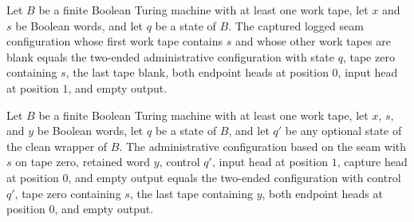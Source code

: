 \begin{lemma}
\label{Complexity.enumCont_clean_entry_words}
\leanok
{}
Let $B$ be a finite Boolean Turing machine with at least one work tape, let $x$ and $s$
be Boolean words, and let $q$ be a state of $B$. The captured logged seam configuration
whose first work tape contains $s$ and whose other work tapes are blank equals the
two-ended administrative configuration with state $q$, tape zero containing $s$, the
last tape blank, both endpoint heads at position $0$, input head at position $1$, and
empty output.
\end{lemma}

\begin{lemma}
\label{Complexity.enumCont_clean_exit_words}
\leanok
{}
Let $B$ be a finite Boolean Turing machine with at least one work tape, let $x$, $s$,
and $y$ be Boolean words, let $q$ be a state of $B$, and let $q'$ be any optional state
of the clean wrapper of $B$. The administrative configuration based on the seam with $s$
on tape zero, retained word $y$, control $q'$, input head at position $1$, capture head
at position $0$, and empty output equals the two-ended configuration with control $q'$,
tape zero containing $s$, the last tape containing $y$, both endpoint heads at position
$0$, and empty output.
\end{lemma}

